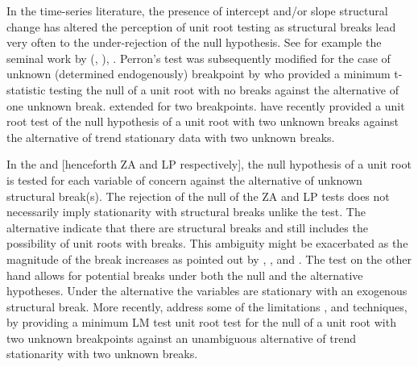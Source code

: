 \documentclass[a4paper,fleqn]{article} %
\begin{document}
In the time-series literature, the presence of intercept and/or slope structural change has altered the perception of unit root testing as structural breaks lead very often to the under-rejection of the null hypothesis. See for example the seminal work by \citeauthor{Perron:1989} (\citeyear{Perron:1989}, \citeyear{Perron:1990}), \citet{Perron:1992}. Perron's test was subsequently modified for the case of unknown (determined endogenously) breakpoint by \citet{Zivot:1992} who provided a minimum t-statistic testing the null of a unit root with no breaks against the alternative of one unknown break. \citet{Lumsdaine:1997} extended \citet{Zivot:1992} for two breakpoints. \citet{Lee:2003} have recently provided a unit root test of the null hypothesis of a unit root with two unknown breaks against the alternative of trend stationary data with two unknown breaks.

In the \citet{Zivot:1992} and \citet{Lumsdaine:1997} [henceforth ZA and LP respectively], the null hypothesis of a unit root is tested for each variable of concern against the alternative of unknown structural break(s). The rejection of the null of the ZA and LP tests does not necessarily imply stationarity with structural breaks unlike the \citet{Perron:1989} test.  The alternative indicate that there are structural breaks and still includes the possibility of unit roots with breaks. This ambiguity might be exacerbated as the magnitude of the break increases as pointed out by \citet{Nunes:1997}, \citet{Vogelsang:1998}, and \citet{Lee:2001}. The \citet{Perron:1989} test on the other hand allows for potential breaks under both the null and the alternative hypotheses. Under the alternative the variables are stationary with an exogenous structural break. More recently, \citet{Lee:2003} address some of the limitations \citet{Perron:1989}, \citet{Zivot:1992} and \citet{Lumsdaine:1997} techniques, by providing a minimum LM test unit root test for the null of a unit root with two unknown breakpoints against an unambiguous alternative of trend stationarity with two unknown breaks.
\end{document}
